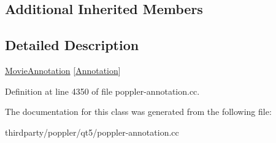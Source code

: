 \subsection*{Additional Inherited Members}


\subsection{Detailed Description}
\hyperlink{class_poppler_1_1_movie_annotation}{Movie\+Annotation} \mbox{[}\hyperlink{class_poppler_1_1_annotation}{Annotation}\mbox{]} 

Definition at line 4350 of file poppler-\/annotation.\+cc.



The documentation for this class was generated from the following file\+:\begin{DoxyCompactItemize}
\item 
thirdparty/poppler/qt5/poppler-\/annotation.\+cc\end{DoxyCompactItemize}
